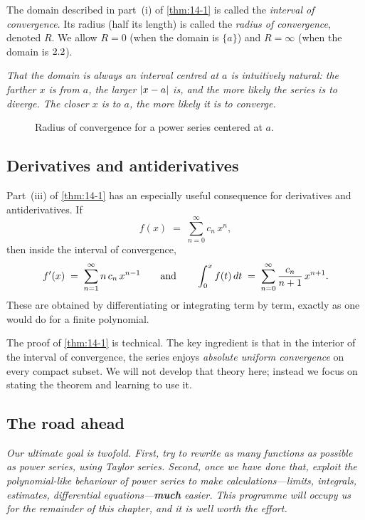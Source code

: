 \begin{definition}
\label{def:14-2}
The domain described in part~(i) of \cref{thm:14-1} is called the \emph{interval of convergence}.  Its radius (half its length) is called the \emph{radius of convergence}, denoted $R$.  We allow $R=0$ (when the domain is $\{a\}$) and $R=\infty$ (when the domain is $2.2$).
\end{definition}

\textit{That the domain is always an interval centred at $a$ is intuitively natural: the farther $x$ is from $a$, the larger $\left\lvert x-a \right\rvert$ is, and the more likely the series is to diverge.  The closer $x$ is to $a$, the more likely it is to converge.}

\begin{figure}[ht]
  \centering
  
  \caption{Radius of convergence for a power series centered at $a$.}
  \label{fig:radius-of-convergence}
\end{figure}

\subsection*{Derivatives and antiderivatives}

Part~(iii) of \cref{thm:14-1} has an especially useful consequence for derivatives and antiderivatives.  If
\[
  f(x) \;=\; \sum_{n=0}^{\infty}c_{n}\,x^{n},
\]
then inside the interval of convergence,
\[
  f'(x) \;=\; \sum_{n=1}^{\infty}n\,c_{n}\,x^{n-1}
  \qquad\text{and}\qquad
  \int_{0}^{x}f(t)\,dt \;=\; \sum_{n=0}^{\infty}\frac{c_{n}}{n+1}\,x^{n+1}.
\]
These are obtained by differentiating or integrating term by term, exactly as one would do for a finite polynomial.

\begin{remark}
The proof of \cref{thm:14-1} is technical.  The key ingredient is that in the interior of the interval of convergence, the series enjoys \emph{absolute uniform convergence} on every compact subset.  We will not develop that theory here; instead we focus on stating the theorem and learning to use it.
\end{remark}

\subsection*{The road ahead}

\textit{Our ultimate goal is twofold.  First, try to rewrite as many functions as possible as power series, using \emph{Taylor series}.  Second, once we have done that, exploit the polynomial-like behaviour of power series to make calculations---limits, integrals, estimates, differential equations---\textbf{much} easier.  This programme will occupy us for the remainder of this chapter, and it is well worth the effort.}

